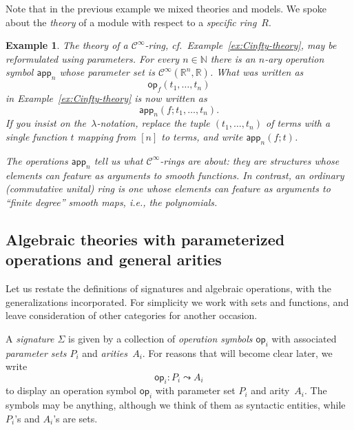 \documentclass{amsart}
\newcommand{\NN}{\mathbb{N}} %
\newcommand{\RR}{\mathbb{R}} %
\newcommand{\op}[1]{\mathsf{op}_{#1}} %
\newcommand{\opdecl}[3]{#1 : #2 \leadsto #3} %
\newcommand{\Cinfty}{\mathcal{C}^\infty}
\newtheorem{example}{Example}[section]
\begin{document}
Note that in the previous example we mixed theories and models. We spoke about
the \emph{theory} of a module with respect to a \emph{specific ring}~$R$.

\begin{example}
  The theory of a $\Cinfty$-ring, cf.\ Example~\ref{ex:Cinfty-theory}, may be
  reformulated using parameters. For every $n \in \NN$ there is an $n$-ary
  operation symbol $\mathsf{app}_n$ whose parameter set is
  $\Cinfty(\RR^n, \RR)$. What was written as
  \begin{equation*}
    \op{f}(t_1, \ldots, t_n)
  \end{equation*}
  in Example~\ref{ex:Cinfty-theory} is now written as
  \begin{equation*}
    \mathsf{app}_n(f; t_1, \ldots, t_n).
  \end{equation*}
  If you insist on the~$\lambda$-notation, replace the tuple
  $(t_1, \ldots, t_n)$ of terms with a single function $t$ mapping from $[n]$ to
  terms, and write $\mathsf{app}_n(f; t)$.

  The operations $\mathsf{app}_n$ tell us what $\Cinfty$-rings are about: they
  are structures whose elements can feature as arguments to smooth functions. In
  contrast, an ordinary (commutative unital) ring is one whose elements can
  feature as arguments to ``finite degree'' smooth maps, i.e., the polynomials.

\end{example}


\subsection{Algebraic theories with parameterized operations and general arities}
\label{sec:algebr-theor-with}

Let us restate the definitions of signatures and algebraic operations, with the
generalizations incorporated. For simplicity we work with sets and functions,
and leave consideration of other categories for another occasion.

A \emph{signature $\Sigma$} is given by a collection of \emph{operation symbols
  $\op{i}$} with associated \emph{parameter sets $P_i$} and
\emph{arities~$A_i$}. For reasons that will become clear later, we write
%
\begin{equation*}
  \opdecl{\op{i}}{P_i}{A_i}
\end{equation*}
%
to display an operation symbol $\op{i}$ with parameter set $P_i$ and
arity~$A_i$. The symbols may be anything, although we think of them as syntactic
entities, while $P_i$'s and $A_i$'s are sets.
\end{document}
